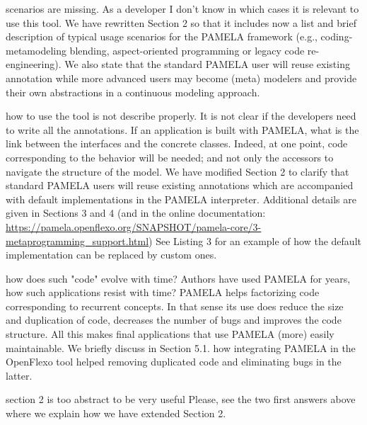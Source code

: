 \documentclass[10pt]{article}
\begin{document}
\pagebreak

\begin{response}{scenarios are missing. As a developer I don't know in which cases it is relevant to use this tool.}
We have rewritten Section 2 so that it includes now a list and brief description of typical usage scenarios for the PAMELA framework (e.g., coding-metamodeling blending, aspect-oriented programming or legacy code re-engineering). We also state that the standard PAMELA user will reuse existing annotation while more advanced users may become (meta) modelers and provide their own abstractions in a continuous modeling approach. 
\end{response}


\begin{response}{how to use the tool is not describe properly. It is not clear if the developers need to write all the annotations. If an application is built with PAMELA, what is the link between the interfaces and the concrete classes. Indeed, at one point, code corresponding to the behavior will be needed; and not only the accessors to navigate the structure of the model.}
We have modified Section 2 to clarify that standard PAMELA users will reuse existing annotations which are accompanied with default implementations in the PAMELA interpreter. Additional details are given in Sections 3 and 4 (and in the online documentation: \url{https://pamela.openflexo.org/SNAPSHOT/pamela-core/3-metaprogramming_support.html}) See Listing 3 for an example of how the default implementation can be replaced by custom ones.
\end{response}

\begin{response}{how does such "code" evolve with time? Authors have used PAMELA for years, how such applications resist with time?}
PAMELA helps factorizing code corresponding to recurrent concepts. In that sense its use does reduce the size and duplication of code, decreases the number of bugs and improves the code structure. All this makes final applications that use PAMELA (more) easily maintainable.
We briefly discuss in Section 5.1. how integrating PAMELA in the OpenFlexo tool helped removing duplicated code and eliminating bugs in the latter.
\end{response}

\begin{response}{section 2 is too abstract to be very useful}
Please, see the two first answers above where we explain how we have extended Section 2.
\end{response}
\end{document}
